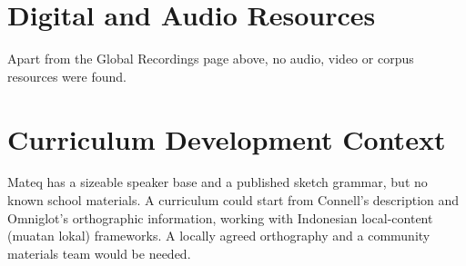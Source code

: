 \documentclass[12pt]{article}
\begin{document}
\section{Digital and Audio Resources}
Apart from the Global Recordings page above, no audio, video or corpus resources were found.

\section{Curriculum Development Context}
Mateq has a sizeable speaker base and a published sketch grammar, but no known school materials. A curriculum could start from Connell's description and Omniglot's orthographic information, working with Indonesian local-content (muatan lokal) frameworks. A locally agreed orthography and a community materials team would be needed.
\end{document}
